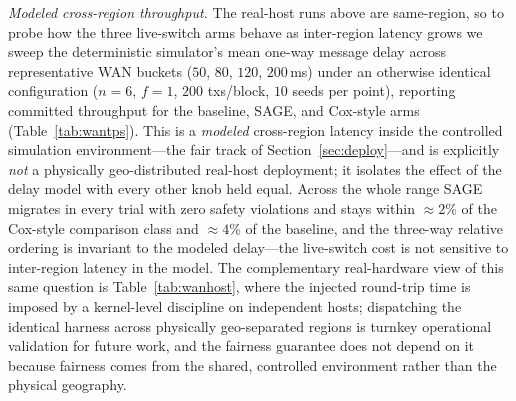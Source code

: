 \documentclass[journal]{IEEEtran}
\theoremstyle{definition}
\theoremstyle{remark}
\begin{document}
\emph{Modeled cross-region throughput.} The real-host runs above are same-region, so to
probe how the three live-switch arms behave as inter-region latency grows we sweep the
deterministic simulator's mean one-way message delay across representative WAN buckets
($50$, $80$, $120$, $200$\,ms) under an otherwise identical configuration ($n{=}6$, $f{=}1$,
$200$ txs/block, $10$ seeds per point), reporting committed throughput for the baseline, SAGE,
and Cox-style arms (Table~\ref{tab:wantps}). This is a \emph{modeled} cross-region latency
inside the controlled simulation environment---the fair track of Section~\ref{sec:deploy}---and
is explicitly \emph{not} a physically geo-distributed real-host deployment; it isolates the
effect of the delay model with every other knob held equal. Across the whole range SAGE
migrates in every trial with zero safety violations and stays within ${\approx}2\%$ of the
Cox-style comparison class and ${\approx}4\%$ of the baseline, and the three-way relative ordering is
invariant to the modeled delay---the live-switch cost is not sensitive to inter-region latency
in the model. The complementary real-hardware view of this same question is
Table~\ref{tab:wanhost}, where the injected round-trip time is imposed by a kernel-level discipline
on independent hosts; dispatching the identical harness across physically geo-separated regions is
turnkey operational validation for future work, and the fairness guarantee does not depend on it
because fairness comes from the shared, controlled environment rather than the physical geography.

\begin{table}[t]
\centering
\caption{Modeled cross-region throughput: committed TPS for the three live-switch arms as the
simulator's mean one-way inter-region delay grows, under an \emph{identical} configuration
($n{=}6$, $f{=}1$, $200$ txs/block, $10$ seeds/point). This is a \emph{simulator model} of WAN
latency in the controlled fair environment, not a physically geo-distributed deployment. SAGE
migrates in every trial with zero safety violations at every delay; the SAGE-vs-Cox spread stays
within ${\approx}2\%$ and the relative ordering is invariant to the modeled delay.}
\label{tab:wantps}
\setlength{\tabcolsep}{5pt}
\renewcommand{\arraystretch}{1.2}
\footnotesize
{}
\end{table}
\end{document}
